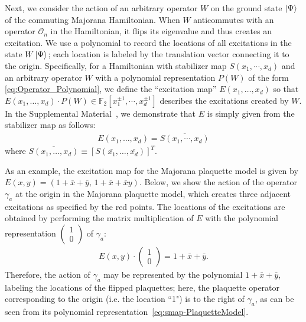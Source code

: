 \documentclass[aps,twocolumn,preprintnumbers,floatfix,showpacs,prx]{revtex4-1}
\begin{document}
Next, we consider the action of an arbitrary operator $W$
on the ground state $\ket{\Psi}$ of the commuting Majorana Hamiltonian.    
When $W$ anticommutes with an operator $\mathcal{O}_{n}$ in the Hamiltonian,
it flips its eigenvalue and thus creates an excitation.  
We use a polynomial to record the locations of all excitations in the state $W\ket{\Psi}$;
each location is labeled by the translation vector connecting it to the origin.
Specifically, for a Hamiltonian with stabilizer map $S(x_{1},\cdots,x_{d})$
and an arbitrary operator $W$ with a polynomial representation $P(W)$ of the form \eqref{eq:Operator_Polynomial},
we define the ``excitation map'' $E(x_{1},\ldots,x_{d})$ so that $E(x_{1},\ldots,x_{d}) \cdot P(W) \in \mathbb{F}_2[x_1^{\pm1}, \cdots, x_d^{\pm1}]$
describes the excitations created by $W$.
In the Supplemental Material~\cite{Supp_Mat},
we demonstrate that $E$ is simply given from the stabilizer map as follows: 
\begin{align}
E(x_{1},\ldots,x_{d}) = \overline{ S(x_1,\cdots,x_d) }
\end{align}
where $\overline{S(x_1,\ldots,x_d)} \equiv [S(\overline{x_1}, \ldots, \overline{x_d})]^T$.

As an example, the excitation map for the Majorana plaquette model is given by 
$E(x,y) = (1 + \bar{x} + \bar{y},\,1 + \bar{x} + \bar{x}y )$.
Below, we show the action of the operator $\gamma_a$
at the origin in the Majorana plaquette model,
which creates three adjacent excitations as specified by the red points.
The locations of the excitations are obtained by performing the matrix multiplication of 
$E$ with the polynomial representation $\begin{pmatrix} 1 \\ 0 \end{pmatrix}$ of $\gamma_{a}$:
\begin{align}
E(x,y) \cdot \begin{pmatrix} 1\\ 0 \end{pmatrix} = 1 + \bar{x} + \bar{y}.
\end{align}
Therefore, the action of $\gamma_a$
may be represented by the polynomial $1 + \bar{x} + \bar{y}$,
labeling the locations of the flipped plaquettes;
here, the plaquette operator corresponding to the origin (i.e. the location ``1")
is to the right of $\gamma_a$,
as can be seen from its polynomial representation~\eqref{eq:smap-PlaquetteModel}.
\end{document}
